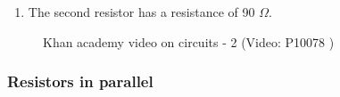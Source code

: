 {\begin{mdframed}[linewidth=4, leftmargin=40, rightmargin=40]
\begin{exercise}
\begin{enumerate}[noitemsep, label=\textbf{Step} \textbf{\arabic*}. ]
          
          \item  
          \label{m38776*id65371}The second resistor has a resistance of 90 \begin{math}\Omega \end{math}. \par 
          \end{enumerate}
         

    \end{exercise}
    \end{mdframed}
    }
    \noindent
  
        



    \setcounter{subfigure}{0}


	\begin{figure}[H] %
    
        
    \textnormal{Khan academy video on circuits - 2}\vspace{.1in} \nopagebreak
  \label{m38776*yt-media2}\label{m38776*yt-video2}
             { (Video:  P10078 )}
      
      \vspace{2pt}
    \vspace{.1in}
        
    

 \end{figure}   

    \addtocounter{footnote}{-0}
    



        
        \label{m38776*uid67}
            \subsubsection{ Resistors in parallel}
            \nopagebreak
            
